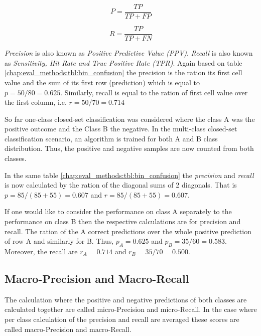 {\begin{equation}\label{chap:eval_methods:eq:precision}
	P = \frac {TP} {TP + FP}
\end{equation}

\begin{equation}\label{chap:eval_methods:eq:recall}
	R = \frac {TP} {TP + FN}
\end{equation}

\textit{Precision} is also known as \textit{Positive Predictive Value (PPV)}. \textit{Recall} is also known as \textit{Sensitivity, Hit Rate and True Positive Rate (TPR)}. Again based on table \ref{chap:eval_methods:tbl:bin_confusion} the precision is the ration its first cell value and the sum of its first row (prediction) which is equal to $p = 50 / 80 = 0.625$. Similarly, recall is equal to the ration of first cell value over the first column, i.e. $r = 50 / 70 = 0.714$

So far one-class closed-set classification was considered where the class A was the positive outcome and the Class B the negative. In the multi-class closed-set classification scenario, an algorithm is trained for both A and B class distribution. Thus, the positive and negative samples are now counted from both classes.

In the same table \ref{chap:eval_methods:tbl:bin_confusion} the \textit{precision} and \textit{recall} is now calculated by the ration of the diagonal sums of 2 diagonals. That is $p = 85 / (85 + 55) = 0.607$ and $r = 85 / (85 + 55) = 0.607$. 

If one would like to consider the performance on class A separately to the performance on class B then the respective calculations are for precision and recall. The ration of the A correct predictions over the whole positive prediction of row A and similarly for B. Thus, $p_{A} = 0.625$ and $p_{B} = 35 / 60 = 0.583$. Moreover, the recall are $r_{A} = 0.714$ and $r_{B} = 35 / 70 = 0.500$.

\subsection{Macro-Precision and Macro-Recall}\label{chap:eval_methods:sec:prf_macro}

The calculation where the positive and negative predictions of both classes are calculated together are called micro-Precision and micro-Recall. In the case where per class calculation of the precision and recall are averaged these scores are called macro-Precision and macro-Recall. 

}

